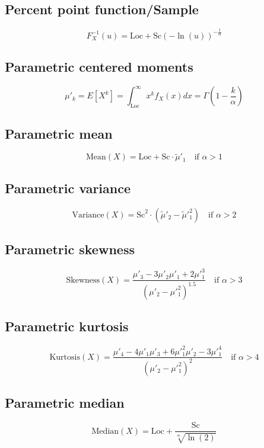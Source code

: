 \documentclass{article}
\begin{document}
\subsection{Percent point function/Sample}
\begin{equation*} F^{-1}_{X}\left(u\right)=\text{Loc}+\text{Sc}\left(-\ln(u)\right)^{-\frac{1}{\alpha}} \end{equation*}
\subsection{Parametric centered moments}
\begin{equation*} \mu'_{k}=E[X^k]=\int_{\text{Loc}}^{\infty }x^{k}f_{X}\left(x\right)dx=\Gamma\left(1-\frac{k}{\alpha}\right) \end{equation*}
\subsection{Parametric mean}
\begin{equation*} \mathrm{Mean}(X)=\text{Loc}+\text{Sc}\cdot\tilde{\mu}'_{1} \quad \text{if } \alpha>1 \end{equation*}
\subsection{Parametric variance}
\begin{equation*} \mathrm{Variance}(X)=\text{Sc}^{2}\cdot(\tilde{\mu}'_{2}-\tilde{\mu}'^{2}_{1}) \quad \text{if } \alpha>2 \end{equation*}
\subsection{Parametric skewness}
\begin{equation*} \mathrm{Skewness}(X)=\frac{\mu'_{3}-3\mu'_{2}\mu'_{1}+2\mu'^{3}_{1}}{(\mu'_{2}-\mu'^{2}_{1})^{1.5}} \quad \text{if } \alpha>3 \end{equation*}
\subsection{Parametric kurtosis}
\begin{equation*} \mathrm{Kurtosis}(X)=\frac{\mu'_{4}-4\mu'_{1}\mu'_{3}+6\mu'^{2}_{1}\mu'_{2}-3\mu'^{4}_{1}}{(\mu'_{2}-\mu'^{2}_{1})^{2}} \quad \text{if } \alpha>4 \end{equation*}
\subsection{Parametric median}
\begin{equation*} \mathrm{Median}(X)=\text{Loc}+\frac{\text{Sc}}{\sqrt[\alpha]{\ln(2)}} \end{equation*}
\end{document}
